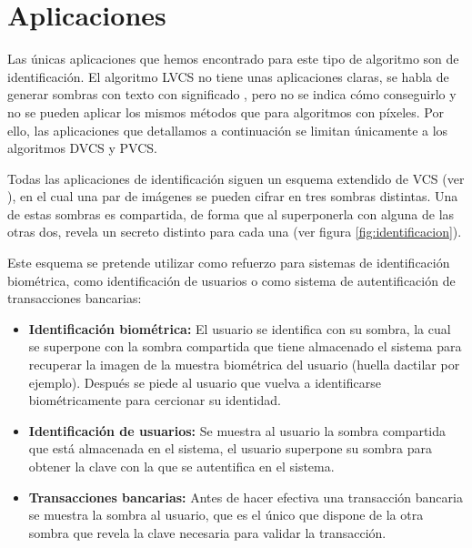\section{Aplicaciones}
Las únicas aplicaciones que hemos encontrado para este tipo de algoritmo son de
identificación. El algoritmo LVCS no tiene unas aplicaciones claras, se habla de
generar sombras con texto con significado \cite{articulo_base}, pero no se
indica cómo conseguirlo y no se pueden aplicar los mismos métodos que para
algoritmos con píxeles. Por ello, las aplicaciones que detallamos a continuación
se limitan únicamente a los algoritmos DVCS y PVCS.

Todas las aplicaciones de identificación siguen un esquema extendido de VCS (ver
\cite{aplicaciones_bio}), en el cual una par de imágenes se pueden cifrar en
tres sombras distintas. Una de estas sombras es compartida, de forma que al
superponerla con alguna de las otras dos, revela un secreto distinto para cada
una (ver figura \ref{fig:identificacion}).

Este esquema se pretende utilizar como refuerzo para sistemas de identificación
biométrica, como identificación de usuarios o como sistema de autentificación de
transacciones bancarias:

\begin{itemize}
	\item \textbf{Identificación biométrica:} El usuario se identifica con
		su sombra, la cual se superpone con la sombra compartida que
		tiene almacenado el sistema para recuperar la imagen de la
		muestra biométrica del usuario (huella dactilar por ejemplo).
		Después se piede al usuario que vuelva a identificarse
		biométricamente para cercionar su identidad.
	\item \textbf{Identificación de usuarios:} Se muestra al usuario la
		sombra compartida que está almacenada en el sistema, el usuario
		superpone su sombra para obtener la clave con la que se
		autentifica en el sistema.
	\item \textbf{Transacciones bancarias:} Antes de hacer efectiva una
		transacción bancaria se muestra la sombra al usuario, que es el
		único que dispone de la otra sombra que revela la clave
		necesaria para validar la transacción.
\end{itemize}

